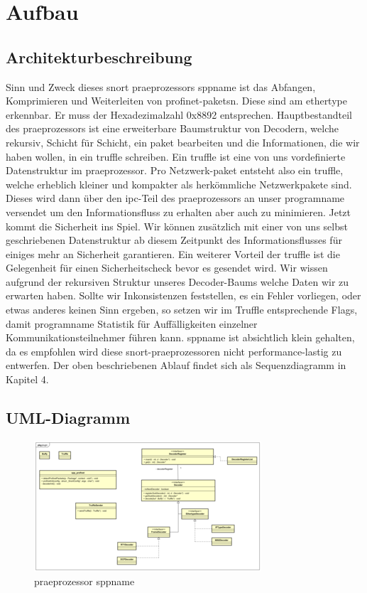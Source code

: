 \chapter{Aufbau \sppname}

\section{Architekturbeschreibung}

Sinn und Zweck dieses \gls{snort} \gls{praeprozessor}s \gls{sppname} ist das Abfangen,
Komprimieren und Weiterleiten von \gls{profinet}-\glspl{paket}n. Diese
sind am \gls{ethertype} erkennbar. Er muss der Hexadezimalzahl 0x8892 entsprechen.
Hauptbestandteil des \gls{praeprozessor}s ist eine erweiterbare Baumstruktur von Decodern, welche rekursiv, Schicht für Schicht, ein \gls{paket} bearbeiten und die Informationen, die wir haben wollen, in ein \gls{truffle} schreiben. Ein \gls{truffle} ist eine von uns vordefinierte Datenstruktur im \gls{praeprozessor}.
Pro Netzwerk-\gls{paket} entsteht also ein \gls{truffle}, welche erheblich kleiner und kompakter als herkömmliche Netzwerkpakete sind. Dieses wird dann über den \gls{ipc}-Teil des \gls{praeprozessor}s
an unser \gls{programname} versendet um den Informationsfluss zu erhalten aber auch zu minimieren.\newline
Jetzt kommt die Sicherheit ins Spiel. Wir können zusätzlich mit einer von uns selbst geschriebenen Datenstruktur ab diesem Zeitpunkt des Informationsflusses für einiges mehr an Sicherheit garantieren.
Ein weiterer Vorteil der \gls{truffle} ist die Gelegenheit für einen Sicherheitscheck bevor es gesendet wird. Wir wissen aufgrund der rekursiven Struktur unseres Decoder-Baums welche Daten wir zu erwarten haben. Sollte wir Inkonsistenzen feststellen, es ein Fehler vorliegen, oder etwas anderes keinen Sinn ergeben, so setzen wir im Truffle entsprechende Flags, damit \gls{programname} Statistik für Auffälligkeiten einzelner Kommunikationsteilnehmer führen kann.\newline
\gls{sppname} ist absichtlich klein gehalten, da es empfohlen wird diese \gls{snort}-\gls{praeprozessor}en nicht performance-lastig zu entwerfen. Der oben beschriebenen Ablauf findet sich als Sequenzdiagramm in Kapitel 4.


\section{UML-Diagramm}

\begin{figure}
  \centering
  \includegraphics[width=\paperwidth]{../diagramimages/spp_profinet.png}
  \caption{\gls{praeprozessor} \gls{sppname}}
\end{figure}
